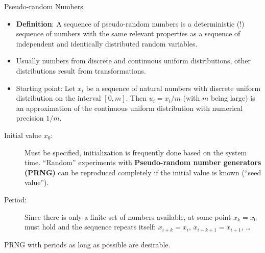 \begin{vbframe}{Pseudo-random Numbers}
\begin{itemize}
 \item \textbf{Definition}: A sequence of pseudo-random numbers is a
  deterministic (!) sequence of numbers with the same relevant
  properties as a sequence of independent and identically distributed
  random variables.
 \item Usually numbers from discrete and continuous uniform distributions,
  other distributions result from transformations.
 \item Starting point: Let $x_i$ be a sequence of natural numbers with discrete uniform distribution on the
  interval $[0,m]$. Then $u_i=x_i/m$ (with $m$ being large) is an approximation of the continuous uniform distribution with numerical precision $1/m$.
\end{itemize}


\framebreak

\begin{description}
 \item[Initial value $x_0$:] Must be specified, initialization is frequently done based on the system time. \enquote{Random} experiments with
  \textbf{Pseudo-random number generators (PRNG)} can be reproduced completely
  if the initial value is known (\enquote{seed value}).
 \item[Period:] Since there is only a finite set of numbers available, at some point $x_k=x_0$ must hold and the sequence repeats itself: $x_{i+k}=x_i$, $x_{i+k+1}=x_{i+1}$, \ldots
\end{description}

\lz

PRNG with periods as long as possible are desirable.

\end{vbframe}



